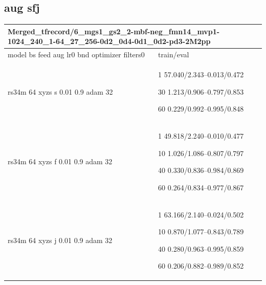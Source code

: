 \documentclass[,table,dvipsnames]{article}
\begin{document}
\subsection{aug sfj}
\noindent\begin{tabular}{|p{9cm}|p{6cm}| }	
	\hline
	\multicolumn{2}{|p{15cm}|}{Merged\_tfrecord/6\_mgs1\_gs2\_2-mbf-neg\_fmn14\_mvp1-1024\_240\_1-64\_27\_256-0d2\_0d4-0d1\_0d2-pd3-2M2pp}\\
	\hline
	model bs feed aug lr0 bnd optimizer filters0 & train/eval \\
	
	\rowcolor{yellow!20}
	rs34m 64 xyzs s 0.01 0.9 adam 32&1 57.040/2.343--0.013/0.472\par 30 1.213/0.906--0.797/0.853\par 60 0.229/0.992--0.995/0.848\\
	
	\rowcolor{red!20}
	rs34m 64 xyzs f 0.01 0.9 adam 32& 1 49.818/2.240--0.010/0.477\par 10 1.026/1.086--0.807/0.797\par 40 0.330/0.836--0.984/0.869\par 60 0.264/0.834--0.977/0.867\\
	
	\rowcolor{blue!20}
	rs34m 64 xyzs j 0.01 0.9 adam 32& 1 63.166/2.140--0.024/0.502\par 10 0.870/1.077--0.843/0.789\par 40 0.280/0.963--0.995/0.859\par 60 0.206/0.882--0.989/0.852\\
	\hline

\end{tabular}
\end{document}
